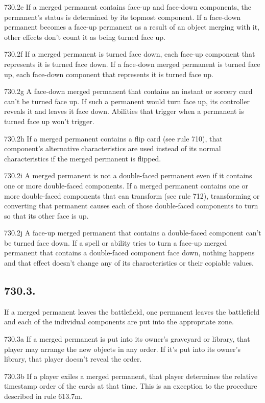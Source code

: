 730.2e If a merged permanent contains face-up and face-down components, the permanent’s status is determined by its topmost component. If a face-down permanent becomes a face-up permanent as a result of an object merging with it, other effects don’t count it as being turned face up.

730.2f If a merged permanent is turned face down, each face-up component that represents it is turned face down. If a face-down merged permanent is turned face up, each face-down component that represents it is turned face up.

730.2g A face-down merged permanent that contains an instant or sorcery card can’t be turned face up. If such a permanent would turn face up, its controller reveals it and leaves it face down. Abilities that trigger when a permanent is turned face up won’t trigger.

730.2h If a merged permanent contains a flip card (see rule 710), that component’s alternative characteristics are used instead of its normal characteristics if the merged permanent is flipped.

730.2i A merged permanent is not a double-faced permanent even if it contains one or more double-faced components. If a merged permanent contains one or more double-faced components that can transform (see rule 712), transforming or converting that permanent causes each of those double-faced components to turn so that its other face is up.

730.2j A face-up merged permanent that contains a double-faced component can’t be turned face down. If a spell or ability tries to turn a face-up merged permanent that contains a double-faced component face down, nothing happens and that effect doesn’t change any of its characteristics or their copiable values.

\subsection*{730.3.}
If a merged permanent leaves the battlefield, one permanent leaves the battlefield and each of the individual components are put into the appropriate zone.

730.3a If a merged permanent is put into its owner’s graveyard or library, that player may arrange the new objects in any order. If it’s put into its owner’s library, that player doesn’t reveal the order.

730.3b If a player exiles a merged permanent, that player determines the relative timestamp order of the cards at that time. This is an exception to the procedure described in rule 613.7m.

